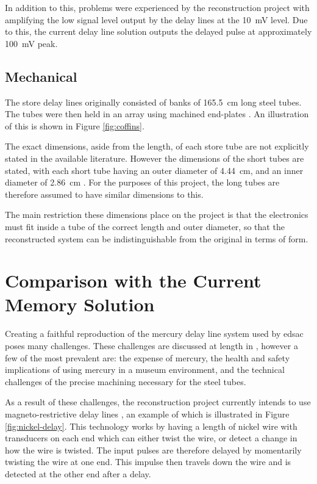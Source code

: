 In addition to this, problems were experienced by the reconstruction project with amplifying the low signal level output by the delay lines at the \SI{10}{\milli\volt} level. Due to this, the current delay line solution outputs the delayed pulse at approximately \SI{100}{\milli\volt} peak.

\subsection{Mechanical} \label{sec:review-delay-mech}
\newcommand{\tubeLenCm}{165.5} %
\newcommand{\tubeOdCm}{4.44} %


The store delay lines originally consisted of banks of \SI{\tubeLenCm}{\centi\metre} long steel tubes. The tubes were then held in an array using machined end-plates \cite[p.210]{wilkes1948}. An illustration of this is shown in Figure \ref{fig:coffins}.

The exact dimensions, aside from the length, of each store tube are not explicitly stated in the available literature. However the dimensions of the short tubes are stated, with each short tube having an outer diameter of \SI{\tubeOdCm}{\centi\metre}, and an inner diameter of \SI{2.86}{\centi\metre} \cite[p. 213]{wilkes1948}. For the purposes of this project, the long tubes are therefore assumed to have similar dimensions to this.

The main restriction these dimensions place on the project is that the electronics must fit inside a tube of the correct length and outer diameter, so that the reconstructed system can be indistinguishable from the original in terms of form.

\section{Comparison with the Current Memory Solution} \label{sec:review-comparison}

Creating a faithful reproduction of the mercury delay line system used by \gls{edsac} poses many challenges. These challenges are discussed at length in \cite{tyler2017}, however a few of the most prevalent are: the expense of mercury, the health and safety implications of using mercury in a museum environment, and the technical challenges of the precise machining necessary for the steel tubes.


As a result of these challenges, the reconstruction project currently intends to use magneto-restrictive delay lines \cite{ward2011}, an example of which is illustrated in Figure \ref{fig:nickel-delay}. This technology works by having a length of nickel wire with transducers on each end which can either twist the wire, or detect a change in how the wire is twisted. The input pulses are therefore delayed by momentarily twisting the wire at one end. This impulse then travels down the wire and is detected at the other end after a delay.

